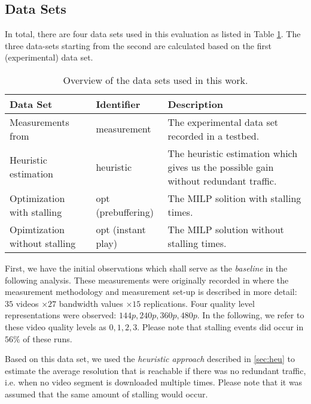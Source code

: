 
\subsection{Data Sets}
\label{sec:datasets}

In total, there are four data sets used in this evaluation as listed in Table \ref{tab:datasets}. The three data-sets starting from the second are calculated based on the first (experimental) data set.
\begin{table}
\caption{Overview of the data sets used in this work.}
\label{tab:datasets}
\centering
\begin{tabular}{p{2cm}p{2.3cm}p{3.2cm}}
\toprule
Data Set & Identifier & Description \\ 
\midrule 
Measurements from \cite{sieber16sacrificing} & measurement & The experimental data set recorded in a testbed. \\ 
\addlinespace
Heuristic estimation & heuristic & The heuristic estimation which gives us the possible gain without redundant traffic. \\ 
\addlinespace
Optimization with stalling & opt (prebuffering) & The MILP solition with stalling times. \\ 
\addlinespace
Opimtization without stalling & opt (instant play) & The MILP solution without stalling times. \\ 
\bottomrule
\end{tabular} 
\end{table}

First, we have the initial observations which shall serve as the \textit{baseline} in the following analysis. These measurements were originally recorded in \cite{sieber16sacrificing} where the measurement methodology and measurement set-up is described in more detail: $35$ videos $\times 27$ bandwidth values $\times 15$ replications. Four quality level representations were observed: $144p, 240p, 360p, 480p$. In the following, we refer to these video quality levels as $0,1,2,3$. Please note that stalling events did occur in $56\%$ of these runs.

Based on this data set, we used the \textit{heuristic approach} described in \ref{sec:heu} to estimate the average resolution that is reachable if there was no redundant traffic, i.e. when no video segment is downloaded multiple times. Please note that it was assumed that the same amount of stalling would occur.

